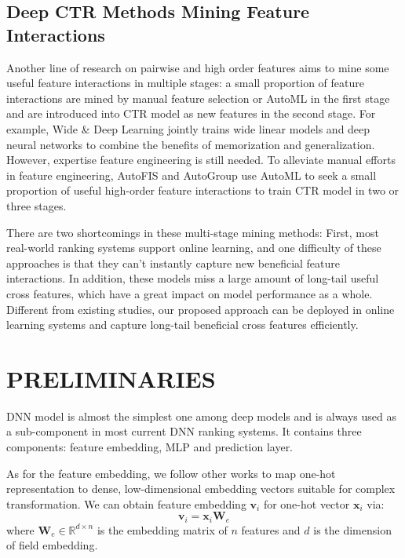 \documentclass[sigconf,authorversion]{acmart}
\begin{document}
\subsection{Deep CTR Methods Mining Feature Interactions}

Another line of research on pairwise and high order features  aims to mine some useful feature interactions in multiple stages: a small proportion of feature interactions are mined by manual feature selection or AutoML in the first stage and are introduced into CTR model as new features in the second stage. For example, Wide \& Deep Learning\cite{cheng2016wide} jointly trains wide linear models and deep neural networks to combine the benefits of memorization and generalization. However, expertise feature engineering is still needed. To alleviate manual efforts in feature engineering, AutoFIS\cite{autofis020} and AutoGroup\cite{autogroup20} use AutoML to seek a small proportion of useful high-order feature interactions to train CTR model in two or three stages.

There are two shortcomings in these multi-stage mining methods: First, most real-world ranking systems support online learning, and one difficulty of these approaches is that they can't instantly capture new beneficial feature interactions. In addition, these models miss a large amount of long-tail useful cross features, which have a great impact on model performance  as a whole. Different from existing studies, our proposed approach can be deployed in online learning systems and capture long-tail beneficial cross features efficiently. 

\section{PRELIMINARIES}
DNN model is almost the simplest one among deep models and is always used as a sub-component in most current DNN ranking systems\cite{guo2017deepfm,wang2017deep,WangSCJLHC21,lian2018xdeepfm,HuangZZ19,cheng2016wide}. It contains three components: feature embedding, MLP and prediction layer. 

As for the feature embedding, we follow other works\cite{guo2017deepfm,wang2017deep,WangSCJLHC21,lian2018xdeepfm,HuangZZ19,cheng2016wide} to map one-hot representation to dense, low-dimensional embedding vectors suitable for complex transformation. We can obtain feature embedding $\mathbf{v}_i$ for one-hot vector $\mathbf{x}_i$ via:
  \begin{equation}
    \mathbf{v}_i = \mathbf{x}_i\mathbf{W}_e
  \end{equation}
where $\mathbf{W}_e \in\mathbb{R}^{d\times n}$ is the embedding matrix of $n$ features and $d$ is the dimension of field embedding.
\end{document}

